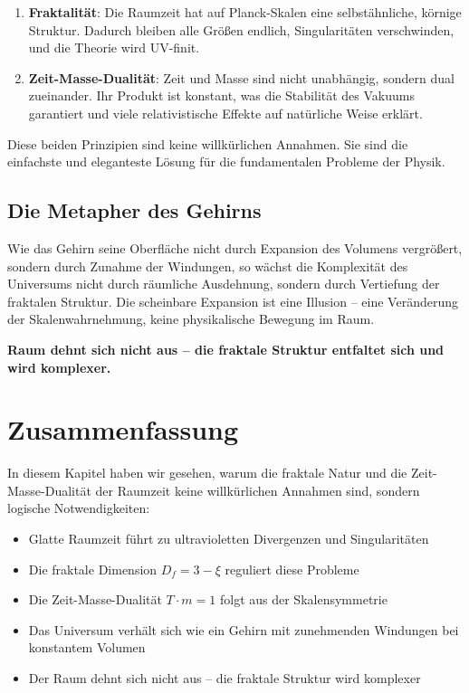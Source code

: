 \begin{enumerate}[leftmargin=*]
\item \textbf{Fraktalität}: Die Raumzeit hat auf Planck-Skalen eine selbstähnliche, körnige Struktur. Dadurch bleiben alle Größen endlich, Singularitäten verschwinden, und die Theorie wird UV-finit.

\item \textbf{Zeit-Masse-Dualität}: Zeit und Masse sind nicht unabhängig, sondern dual zueinander. Ihr Produkt ist konstant, was die Stabilität des Vakuums garantiert und viele relativistische Effekte auf natürliche Weise erklärt.
\end{enumerate}

Diese beiden Prinzipien sind keine willkürlichen Annahmen. Sie sind die einfachste und eleganteste Lösung für die fundamentalen Probleme der Physik.

\subsection{Die Metapher des Gehirns}

Wie das Gehirn seine Oberfläche nicht durch Expansion des Volumens vergrößert, sondern durch Zunahme der Windungen, so wächst die Komplexität des Universums nicht durch räumliche Ausdehnung, sondern durch Vertiefung der fraktalen Struktur. Die scheinbare Expansion ist eine Illusion – eine Veränderung der Skalenwahrnehmung, keine physikalische Bewegung im Raum.

\textbf{Raum dehnt sich nicht aus – die fraktale Struktur entfaltet sich und wird komplexer.}

\section{Zusammenfassung}

In diesem Kapitel haben wir gesehen, warum die fraktale Natur und die Zeit-Masse-Dualität der Raumzeit keine willkürlichen Annahmen sind, sondern logische Notwendigkeiten:

\begin{itemize}[leftmargin=*]
\item Glatte Raumzeit führt zu ultravioletten Divergenzen und Singularitäten
\item Die fraktale Dimension $D_f = 3 - \xi$ reguliert diese Probleme
\item Die Zeit-Masse-Dualität $T \cdot m = 1$ folgt aus der Skalensymmetrie
\item Das Universum verhält sich wie ein Gehirn mit zunehmenden Windungen bei konstantem Volumen
\item Der Raum dehnt sich nicht aus -- die fraktale Struktur wird komplexer
\end{itemize}

